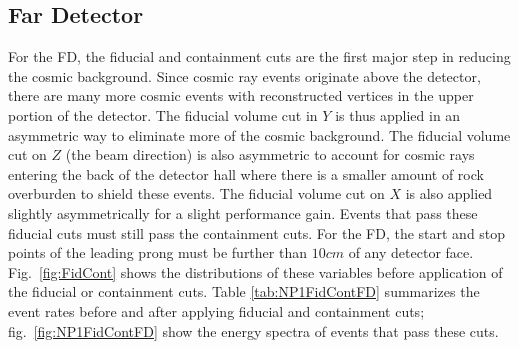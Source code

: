 \subsection{Far Detector}

For the FD, the fiducial and containment cuts are the first major step in reducing the cosmic background. Since cosmic ray events originate above the detector, there are many more cosmic events with reconstructed vertices in the upper portion of the detector. The fiducial volume cut in $Y$ is thus applied in an asymmetric way to eliminate more of the cosmic background. The fiducial volume cut on $Z$ (the beam direction) is also asymmetric to account for cosmic rays entering the back of the detector hall where there is a smaller amount of rock overburden to shield these events. The fiducial volume cut on $X$ is also applied slightly asymmetrically for a slight performance gain. Events that pass these fiducial cuts must still pass the containment cuts. For the FD, the start and stop points of the leading prong must be further than $10\unit{cm}$ of any detector face. Fig.~\ref{fig:FidCont} shows the distributions of these variables before application of the fiducial or containment cuts. Table \ref{tab:NP1FidContFD} summarizes the event rates before and after applying fiducial and containment cuts; fig.~\ref{fig:NP1FidContFD} show the energy spectra of events that pass these cuts.
